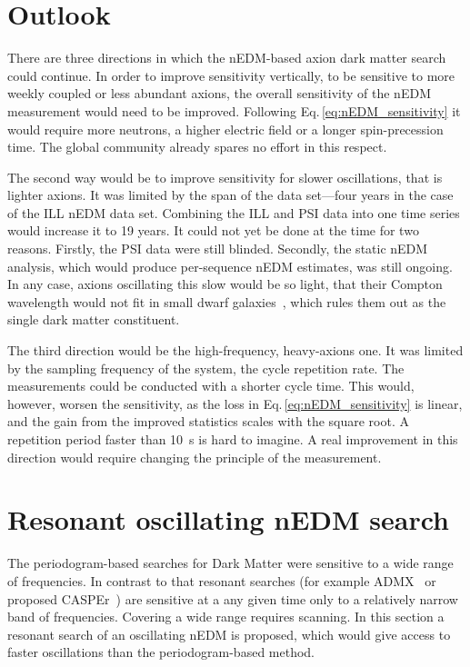 \section{Outlook}
There are three directions in which the nEDM-based axion dark matter search could continue.
In order to improve sensitivity vertically, to be sensitive to more weekly coupled or less abundant axions, the overall sensitivity of the nEDM measurement would need to be improved.
Following Eq.\,\ref{eq:nEDM_sensitivity} it would require more neutrons, a higher electric field or a longer spin-precession time.
The global community already spares no effort in this respect.

The second way would be to improve sensitivity for slower oscillations, that is  lighter axions.
It was limited by the span of the data set---four years in the case of the ILL nEDM data set.
Combining the ILL and PSI data into one time series would increase it to 19 years.
It could not yet be done at the time for two reasons.
Firstly, the PSI data were still blinded.
Secondly, the static nEDM analysis, which would produce per-sequence nEDM estimates, was still ongoing.
In any case, axions oscillating this slow would be so light, that their Compton wavelength would not fit in small dwarf galaxies~\cite{Marsh2015Review}, which rules them out as the single dark matter constituent.

The third direction would be the high-frequency, heavy-axions one.
It was limited by the sampling frequency of the system, the cycle repetition rate.
The measurements could be conducted with a shorter cycle time.
This would, however, worsen the sensitivity, as the loss in Eq.\,\ref{eq:nEDM_sensitivity} is linear, and the gain from the improved statistics scales with the square root.
A repetition period faster than \SI{10}{\second} is hard to imagine.
A real improvement in this direction would require changing the principle of the measurement.




\section{Resonant oscillating nEDM search}
The periodogram-based searches for Dark Matter were sensitive to a wide range of frequencies. In contrast to that resonant searches (for example ADMX~\cite{PhysRevLett.104.041301} or proposed CASPEr~\cite{CASPEr2014}) are sensitive at a any given time only to a relatively narrow band of frequencies. Covering a wide range requires scanning. In this section a resonant search of an oscillating nEDM is proposed, which would give access to faster oscillations than the periodogram-based method.

